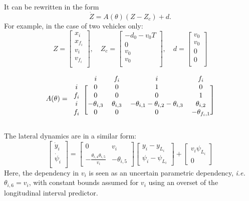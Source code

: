 \documentclass[twocolumn,english]{IEEEtran}
\theoremstyle{plain}
\theoremstyle{definition}
\theoremstyle{plain}
\theoremstyle{plain}
\theoremstyle{remark}
\begin{document}
It can be rewritten in the form $$\dot{Z} = A(\theta)(Z-Z_c) + d.$$ For example, in the case of two vehicles only:
\begin{equation*}
    Z = \begin{bmatrix}
x_i \\
x_{f_i} \\
v_i \\
v_{f_i} \\
\end{bmatrix}
,\quad
Z_c = \begin{bmatrix}
-d_0-v_0 T \\
0 \\
v_0\\
v_0 \\
\end{bmatrix}
,\quad
d = \begin{bmatrix}
v_0 \\
v_0 \\
0\\
0\\
\end{bmatrix}
\end{equation*}

\begin{equation*}
A(\theta)
=
\begin{blockarray}{ccccc}
 & i & f_i & i & f_i \\
\begin{block}{c[cccc]}
i & 0 & 0 & 1 & 0 \\
f_i & 0 & 0 & 0 & 1 \\
i & -\theta_{i,3} & \theta_{i,3} & -\theta_{i,1}-\theta_{i,2}-\theta_{i,3} & \theta_{i,2} \\
f_i & 0 & 0 & 0 & -\theta_{f_i,1} \\
\end{block}
\end{blockarray}
\end{equation*}

The lateral dynamics are in a similar form:
\begin{equation*}
\begin{bmatrix}
\dot{y}_i \\
\dot{\psi}_i \\
\end{bmatrix}
=
\begin{bmatrix}
0 & v_i \\
-\frac{\theta_{i,4} \theta_{i,5}}{v_i} & -\theta_{i,5}
\end{bmatrix}
\begin{bmatrix}
y_i - y_{L_i} \\
\psi_i - \psi_{L_i}
\end{bmatrix}
+
\begin{bmatrix}
v_i\psi_{L_i} \\
0
\end{bmatrix}
\end{equation*}
Here, the dependency in $v_i$ is seen as an uncertain parametric dependency, \emph{i.e.} $\theta_{i,6}=v_i$, with constant bounds assumed for $v_i$ using an overset of the longitudinal interval predictor.
\end{document}
